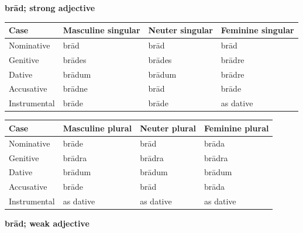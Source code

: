 \textbf{brād; strong adjective}

\par\begingroup
\fontsize{10.5}{13.2}\selectfont
\setlength{\LTleft}{0pt}\setlength{\LTright}{\fill}
\noindent
\begin{tabular}{@{}>{\raggedright\arraybackslash}p{22.0mm}>{\raggedright\arraybackslash}p{31.188mm}>{\raggedright\arraybackslash}p{31.188mm}>{\raggedright\arraybackslash}p{31.188mm}@{}}
\toprule
\textbf{Case} & \textbf{Masculine singular} & \textbf{Neuter singular} & \textbf{Feminine singular} \\
\midrule
Nominative & brād & brād & brād \\
Genitive & brādes & brādes & brādre \\
Dative & brādum & brādum & brādre \\
Accusative & brādne & brād & brāde \\
Instrumental & brāde & brāde & as dative \\
\bottomrule
\end{tabular}
\par\endgroup
\par\addvspace{5pt}
\par\begingroup
\fontsize{10.5}{13.2}\selectfont
\setlength{\LTleft}{0pt}\setlength{\LTright}{\fill}
\noindent
\begin{tabular}{@{}>{\raggedright\arraybackslash}p{22.0mm}>{\raggedright\arraybackslash}p{31.188mm}>{\raggedright\arraybackslash}p{31.188mm}>{\raggedright\arraybackslash}p{31.188mm}@{}}
\toprule
\textbf{Case} & \textbf{Masculine plural} & \textbf{Neuter plural} & \textbf{Feminine plural} \\
\midrule
Nominative & brāde & brād & brāda \\
Genitive & brādra & brādra & brādra \\
Dative & brādum & brādum & brādum \\
Accusative & brāde & brād & brāda \\
Instrumental & as dative & as dative & as dative \\
\bottomrule
\end{tabular}
\par\endgroup

\textbf{brād; weak adjective}

